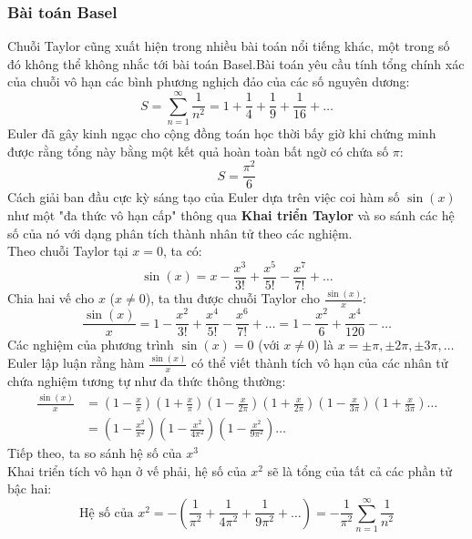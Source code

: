 \documentclass[12pt]{article}
\theoremstyle{definition}
\theoremstyle{remark}
\begin{document}
\subsubsection{Bài toán Basel}
Chuỗi Taylor cũng xuất hiện trong nhiều bài toán nổi tiếng khác, một trong số đó không thể không nhắc tới bài toán Basel.Bài toán yêu cầu tính tổng chính xác của chuỗi vô hạn các bình phương nghịch đảo của các số nguyên dương:
\begin{equation}
    S = \sum_{n=1}^{\infty} \frac{1}{n^2} = 1 + \frac{1}{4} + \frac{1}{9} + \frac{1}{16} + \dots
\end{equation}
Euler đã gây kinh ngạc cho cộng đồng toán học thời bấy giờ khi chứng minh được rằng tổng này bằng một kết quả hoàn toàn bất ngờ có chứa số $\pi$:
\[
S = \frac{\pi^2}{6}
\]
Cách giải ban đầu cực kỳ sáng tạo của Euler dựa trên việc coi hàm số $\sin(x)$ như một "đa thức vô hạn cấp" thông qua \textbf{Khai triển Taylor} và so sánh các hệ số của nó với dạng phân tích thành nhân tử theo các nghiệm.\\
Theo chuỗi Taylor tại $x = 0$, ta có:
\[
\sin(x) = x - \frac{x^3}{3!} + \frac{x^5}{5!} - \frac{x^7}{7!} + \dots
\]
Chia hai vế cho $x$ ($x \neq 0$), ta thu được chuỗi Taylor cho $\frac{\sin(x)}{x}$:
\begin{equation}
    \frac{\sin(x)}{x} = 1 - \frac{x^2}{3!} + \frac{x^4}{5!} - \frac{x^6}{7!} + \dots = 1 - \frac{x^2}{6} + \frac{x^4}{120} - \dots
\end{equation}
Các nghiệm của phương trình $\sin(x) = 0$ (với $x \neq 0$) là $x = \pm \pi, \pm 2\pi, \pm 3\pi, \dots$
 Euler lập luận rằng hàm $\frac{\sin(x)}{x}$ có thể viết thành tích vô hạn của các nhân tử chứa nghiệm tương tự như đa thức thông thường:
\begin{align*}
    \frac{\sin(x)}{x} &= \left(1 - \frac{x}{\pi}\right)\left(1 + \frac{x}{\pi}\right) \left(1 - \frac{x}{2\pi}\right)\left(1 + \frac{x}{2\pi}\right) \left(1 - \frac{x}{3\pi}\right)\left(1 + \frac{x}{3\pi}\right) \dots \\
    &= \left(1 - \frac{x^2}{\pi^2}\right) \left(1 - \frac{x^2}{4\pi^2}\right) \left(1 - \frac{x^2}{9\pi^2}\right) \dots
\end{align*}
Tiếp theo, ta so sánh hệ số của $x^3$\\
Khai triển tích vô hạn ở vế phải, hệ số của $x^2$ sẽ là tổng của tất cả các phần tử bậc hai:
\begin{equation}
    \text{Hệ số của } x^2 = -\left( \frac{1}{\pi^2} + \frac{1}{4\pi^2} + \frac{1}{9\pi^2} + \dots \right) = -\frac{1}{\pi^2} \sum_{n=1}^{\infty} \frac{1}{n^2}
\end{equation}
\end{document}
